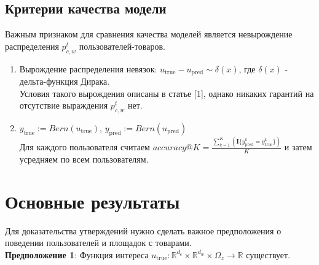 \documentclass{article}
\begin{document}
\subsection{Критерии качества модели}
Важным признаком для сравнения качества моделей является невырождение распределения $p^t_{c,w}$ пользователей-товаров.

\begin{enumerate}
    \item Вырождение распределения невязок: $u_{\text{true}} - u_{\text{pred}} \sim \delta(x)$, где $\delta(x)$ - дельта-функция Дирака.\\
    Условия такого вырождения описаны в статье [1], однако никаких гарантий на отсутствие выраждения $p^t_{c,w}$ нет.

    \item $y_{\text{true}} := Bern(u_{\text{true}})$,
    $y_{\text{pred}} := Bern(u_{\text{pred}})$\\
    Для каждого пользователя считаем $accuracy@K = \frac{\sum^K_{k = 1} (\mathbf{I}\{y^k_{\text{pred}} = y^k_{\text{true}}\})} {K}$ и затем усредняем по всем пользователям.

\end{enumerate}

\section{Основные результаты}
Для доказательства утверждений нужно сделать важное предположения о поведении пользователей и площадок с товарами.\\



{\bf Предположение 1}:
Функция интереса $u_{\text{true}}: \mathbb{R}^{d_c} \times \mathbb{R}^{d_w} \times \Omega_z \to \mathbb{R}$ существует.
\end{document}
